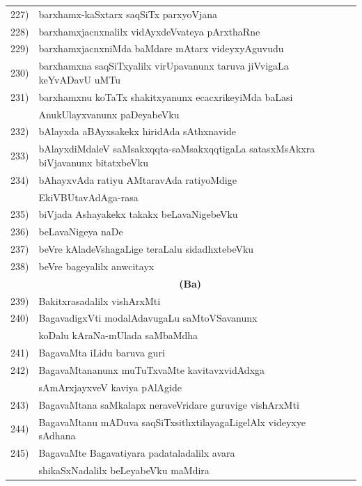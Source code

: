 {\begin{longtable}{@{}cp{7.4cm}r}
227) & barxhamx-kaSxtarx saqSiTx parxyoVjana & \pageref{page91}\\
228) & barxhamxjacnxnalilx vidAyxdeVvateya pArxthaRne & \pageref{page85}\\
229) & barxhamxjacnxniMda baMdare mAtarx videyxyAguvudu & \pageref{page85}\\  
230) & barxhamxna saqSiTxyalilx virUpavanunx taruva jiVvigaLa keYvADavU uMTu & \pageref{page192}\\
231) & barxhamxnu koTaTx shakitxyanunx ecacxrikeyiMda baLasi & \\
     & AnukUlayxvanunx paDeyabeVku & \pageref{page193}\\
232) & bAlayxda aBAyxsakekx hiridAda sAthxnavide & \pageref{page213}\\
233) & bAlayxdiMdaleV saMsakxqqta-saMsakxqqtigaLa satasxMsAkxra biVjavanunx bitatxbeVku & \pageref{page53}\\
234) &  bAhayxvAda ratiyu AMtaravAda ratiyoMdige & \\
     & EkiVBUtavAdAga-rasa & \pageref{page228}\\
235) & biVjada Ashayakekx takakx beLavaNigebeVku & \pageref{page70}\\
236) & beLavaNigeya naDe & \pageref{page66}\\
237) & beVre kAladeVshagaLige teraLalu sidadhxtebeVku & \pageref{page126}\\
238) & beVre bageyalilx anwcitayx & \pageref{page117}\\[0.3cm]
     &  \multicolumn{1}{c}{\textbf{(Ba)}} & \\[0.3cm]
239) & Bakitxrasadalilx vishArxMti & \pageref{page231}\\
240) & BagavadigxVti modalAdavugaLu saMtoVSavanunx & \\
     & koDalu kAraNa-mUlada saMbaMdha & \pageref{page195}\\  
241) & BagavaMta iLidu baruva guri & \pageref{page72}\\
242) & BagavaMtananunx muTuTxvaMte kavitavxvidAdxga & \\
     & sAmArxjayxveV kaviya pAlAgide & \pageref{page183}\\
243) & BagavaMtana saMkalapx neraveVridare guruvige vishArxMti & \pageref{page71}\\
244) & BagavaMtanu mADuva saqSiTxsithxtilayagaLigelAlx videyxye sAdhana & \pageref{page101}\\
245) & BagavaMte Bagavatiyara padataladalilx avara & \\
     & shikaSxNadalilx beLeyabeVku maMdira & \pageref{page67}\\

\end{longtable}}
